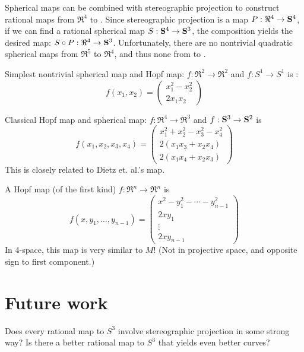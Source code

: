 Spherical maps can be combined with stereographic projection to
construct rational maps from $\Re^4$ to .
Since stereographic projection is a map $P:\Re^4 \rightarrow \mbox{{\bf S}$^{4}$}$,
if we can find a rational spherical map $S:\mbox{{\bf S}$^{4}$} \rightarrow \mbox{{\bf S}$^{3}$}$,
the composition yields the desired map: $S \circ P: \Re^4 \rightarrow \mbox{{\bf S}$^{3}$}$.
Unfortunately, there are no nontrivial quadratic spherical maps from $\Re^5$ to
$\Re^4$, and thus none from  to  \cite[p. 196]{ono94}.

Simplest nontrivial spherical map and Hopf map: $f:\Re^2 \rightarrow \Re^2$ 
and $f:S^1 \rightarrow S^1$ is \cite[pp. 169,173]{ono94}:
\[
	f(x_1,x_2) = \left( \begin{array}{c}
	x_1^2 - x_2^2 \\ 2x_1 x_2
		\end{array} \right)
\]

Classical Hopf map and spherical map: $f:\Re^4 \rightarrow \Re^3$
and $f:\mbox{{\bf S}$^{3}$} \rightarrow \mbox{{\bf S}$^{2}$}$ is \cite[pp. 171,174]{ono94}
\[
\label{eqn:classicalHopf}
	f(x_1,x_2,x_3,x_4) = \left( \begin{array}{c}
	x_1^2 + x_2^2 - x_3^2 - x_4^2 \\
	2(x_1 x_3 + x_2 x_4) \\ 2(x_1 x_4 + x_2 x_3)
		\end{array} \right)
\]
This is closely related to Dietz et. al.'s map.

A Hopf map (of the first kind) $f:\Re^n \rightarrow \Re^n$ is \cite[p. 193]{ono94}
\[
\label{eqn:HopfM}
	f(x,y_1,\ldots,y_{n-1}) = \left( \begin{array}{c}
		x^2 - y_1^2 - \cdots - y_{n-1}^2 \\
		2xy_1 \\ \vdots \\ 2xy_{n-1}
		\end{array} \right)
\]
In 4-space, this map is very similar to $M$!
(Not in projective space, and opposite sign to first component.)


\section{Future work}

Does every rational map to $S^3$ involve stereographic projection
in some strong way?
Is there a better rational map to $S^3$ that yields even better curves?

